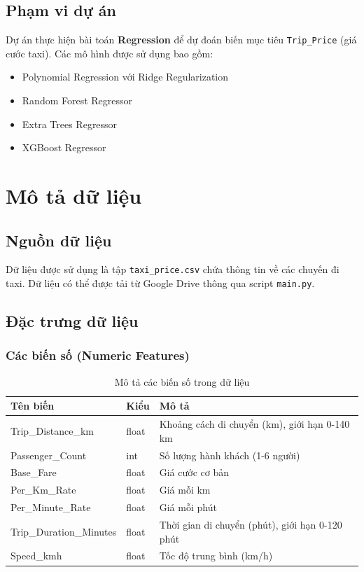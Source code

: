 \documentclass[12pt,a4paper]{article}
\begin{document}
\subsection{Phạm vi dự án}

Dự án thực hiện bài toán \textbf{Regression} để dự đoán biến mục tiêu \texttt{Trip\_Price} (giá cước taxi). Các mô hình được sử dụng bao gồm:
\begin{itemize}
    \item Polynomial Regression với Ridge Regularization
    \item Random Forest Regressor
    \item Extra Trees Regressor
    \item XGBoost Regressor
\end{itemize}

\section{Mô tả dữ liệu}

\subsection{Nguồn dữ liệu}

Dữ liệu được sử dụng là tập \texttt{taxi\_price.csv} chứa thông tin về các chuyến đi taxi. Dữ liệu có thể được tải từ Google Drive thông qua script \texttt{main.py}.

\subsection{Đặc trưng dữ liệu}

\subsubsection{Các biến số (Numeric Features)}

\begin{table}[H]
\centering
\caption{Mô tả các biến số trong dữ liệu}
\label{tab:numeric_features}
\begin{tabular}{|l|l|p{6cm}|}
\hline
\textbf{Tên biến} & \textbf{Kiểu} & \textbf{Mô tả} \\
\hline
Trip\_Distance\_km & float & Khoảng cách di chuyển (km), giới hạn 0-140 km \\
\hline
Passenger\_Count & int & Số lượng hành khách (1-6 người) \\
\hline
Base\_Fare & float & Giá cước cơ bản \\
\hline
Per\_Km\_Rate & float & Giá mỗi km \\
\hline
Per\_Minute\_Rate & float & Giá mỗi phút \\
\hline
Trip\_Duration\_Minutes & float & Thời gian di chuyển (phút), giới hạn 0-120 phút \\
\hline
Speed\_kmh & float & Tốc độ trung bình (km/h) \\
\hline
\end{tabular}
\end{table}
\end{document}
